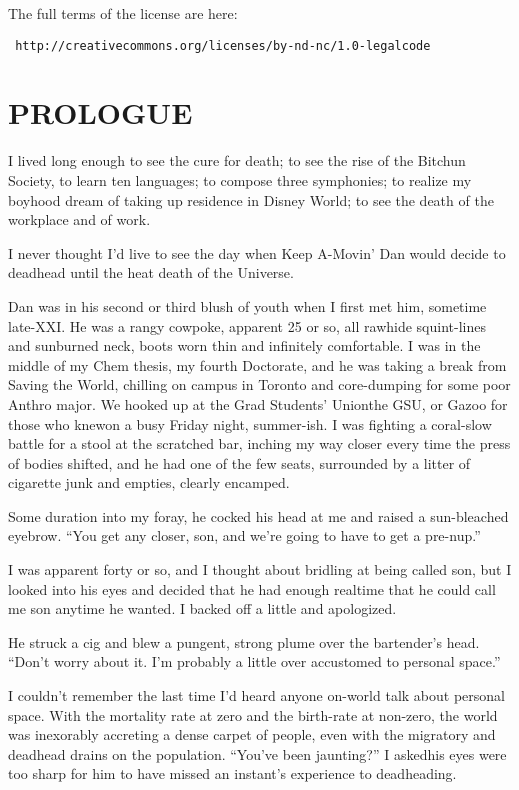 The full terms of the license are here:

\texttt{\footnotesize 
http://creativecommons.org/licenses/by-nd-nc/1.0-legalcode}

\section{PROLOGUE}

I lived long enough to see the cure for death; to see the rise of
the Bitchun Society, to learn ten languages; to compose three
symphonies; to realize my boyhood dream of taking up residence in
Disney World; to see the death of the workplace and of work.

I never thought I'd live to see the day when Keep A-Movin' Dan
would decide to deadhead until the heat death of the Universe.

Dan was in his second or third blush of youth when I first met him,
sometime late-XXI. He was a rangy cowpoke, apparent 25 or so, all
rawhide squint-lines and sunburned neck, boots worn thin and
infinitely comfortable. I was in the middle of my Chem thesis, my
fourth Doctorate, and he was taking a break from Saving the World,
chilling on campus in Toronto and core-dumping for some poor Anthro
major. We hooked up at the Grad Students' Union{\dash}the GSU, or Gazoo
for those who knew{\dash}on a busy Friday night, summer-ish. I was
fighting a coral-slow battle for a stool at the scratched bar,
inching my way closer every time the press of bodies shifted, and
he had one of the few seats, surrounded by a litter of cigarette
junk and empties, clearly encamped.

Some duration into my foray, he cocked his head at me and raised a
sun-bleached eyebrow. “You get any closer, son, and we're going to
have to get a pre-nup.”

I was apparent forty or so, and I thought about bridling at being
called son, but I looked into his eyes and decided that he had
enough realtime that he could call me son anytime he wanted. I
backed off a little and apologized.

He struck a cig and blew a pungent, strong plume over the
bartender's head. “Don't worry about it. I'm probably a little over
accustomed to personal space.”

I couldn't remember the last time I'd heard anyone on-world talk
about personal space. With the mortality rate at zero and the
birth-rate at non-zero, the world was inexorably accreting a dense
carpet of people, even with the migratory and deadhead drains on
the population. “You've been jaunting?” I asked{\dash}his eyes were too
sharp for him to have missed an instant's experience to
deadheading.

